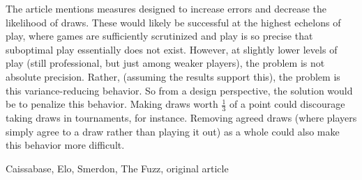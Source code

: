 \documentclass{article}
\begin{document}
The article mentions measures designed to increase errors and decrease the likelihood of draws.
These would likely be successful at the highest echelons of play, where games are sufficiently
scrutinized and play is so precise that suboptimal play essentially does not exist.
However, at slightly lower levels of play (still professional, but just among weaker players), the problem is not absolute precision.
Rather, (assuming the results support this), the problem is this variance-reducing behavior.
So from a design perspective, the solution would be to penalize this behavior.
Making draws worth $\frac{1}{3}$ of a point could discourage taking draws in tournaments, for instance.
Removing agreed draws (where players simply agree to a draw rather than playing it out) as a whole could also make this behavior more difficult.

Caissabase, Elo, Smerdon, The Fuzz, original article
\end{document}
